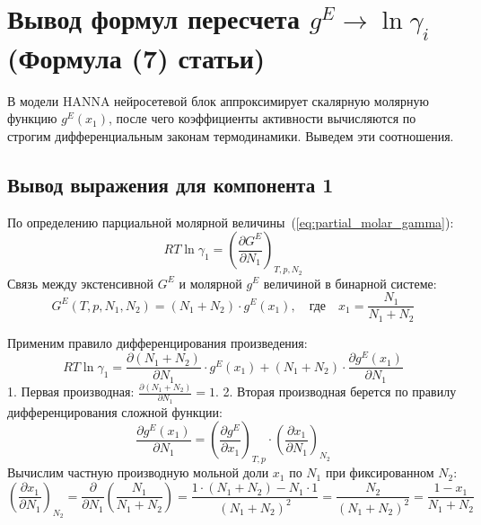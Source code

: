 \documentclass[12pt,a4paper]{article}
\begin{document}
\section{Вывод формул пересчета \texorpdfstring{$g^E \to \ln \gamma_i$}{gE to ln gamma i} (Формула (7) статьи)}

В модели HANNA нейросетевой блок аппроксимирует скалярную молярную функцию $g^E(x_1)$, после чего коэффициенты активности вычисляются по строгим дифференциальным законам термодинамики. Выведем эти соотношения.

\subsection{Вывод выражения для компонента 1}
По определению парциальной молярной величины~(\ref{eq:partial_molar_gamma}):
\begin{equation}
    RT \ln \gamma_1 = \left(\frac{\partial G^E}{\partial N_1}\right)_{T, p, N_2}
\end{equation}
Связь между экстенсивной $G^E$ и молярной $g^E$ величиной в бинарной системе:
\begin{equation}
    G^E(T, p, N_1, N_2) = (N_1 + N_2) \cdot g^E(x_1), \quad \text{где} \quad x_1 = \frac{N_1}{N_1 + N_2}
\end{equation}

Применим правило дифференцирования произведения:
\begin{equation}
    RT \ln \gamma_1 = \frac{\partial (N_1 + N_2)}{\partial N_1} \cdot g^E(x_1) + (N_1 + N_2) \cdot \frac{\partial g^E(x_1)}{\partial N_1}
    \label{eq:step_gamma1}
\end{equation}
1. Первая производная: $\frac{\partial (N_1 + N_2)}{\partial N_1} = 1$.
2. Вторая производная берется по правилу дифференцирования сложной функции:
\begin{equation}
    \frac{\partial g^E(x_1)}{\partial N_1} = \left(\frac{\partial g^E}{\partial x_1}\right)_{T,p} \cdot \left(\frac{\partial x_1}{\partial N_1}\right)_{N_2}
\end{equation}
Вычислим частную производную мольной доли $x_1$ по $N_1$ при фиксированном $N_2$:
\begin{equation}
    \left(\frac{\partial x_1}{\partial N_1}\right)_{N_2} = \frac{\partial}{\partial N_1}\left(\frac{N_1}{N_1 + N_2}\right) = \frac{1 \cdot (N_1 + N_2) - N_1 \cdot 1}{(N_1 + N_2)^2} = \frac{N_2}{(N_1 + N_2)^2} = \frac{1 - x_1}{N_1 + N_2}
\end{equation}
\end{document}
